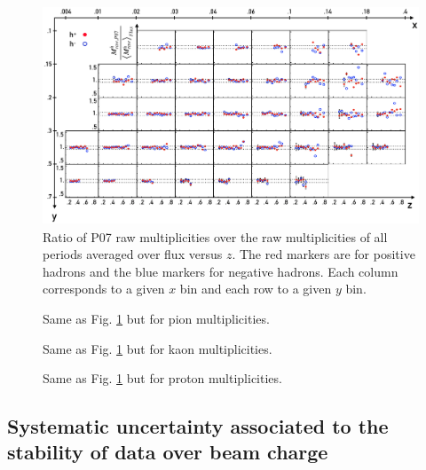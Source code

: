 \begin{figure}
  \centering
	\includegraphics[scale=0.7]{./gfx/SysTimeMult.png}
	\caption{Ratio of P07 raw multiplicities over the raw multiplicities of all periods averaged over flux versus $z$. The red markers are for positive hadrons and the blue markers for negative hadrons. Each column corresponds to a given $x$ bin and each row to a given $y$ bin.}
	\label{pic:hMultTime}
\end{figure}

\begin{figure}
  \centering
	\caption{Same as Fig. \ref{pic:hMultTime} but for pion multiplicities.}
	\label{pic:piMultTime}
\end{figure}

\begin{figure}
  \centering
	\caption{Same as Fig. \ref{pic:hMultTime} but for kaon multiplicities.}
	\label{pic:kMultTime}
\end{figure}

\begin{figure}
  \centering
	\caption{Same as Fig. \ref{pic:hMultTime} but for proton multiplicities.}
	\label{pic:pMultTime}
\end{figure}


\subsection{Systematic uncertainty associated to the stability of data over beam charge}

